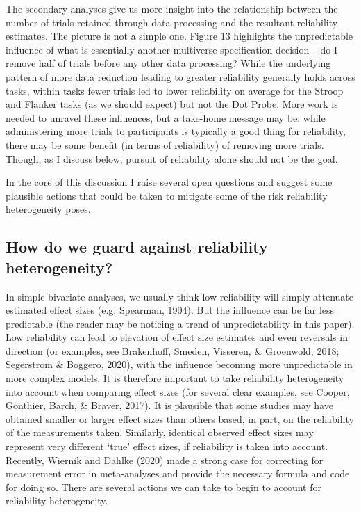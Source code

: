 \documentclass[
  english,
  man,floatsintext]{apa6}
\begin{document}
The secondary analyses give us more insight into the relationship between the number of trials retained through data processing and the resultant reliability estimates. The picture is not a simple one. Figure 13 highlights the unpredictable influence of what is essentially another multiverse specification decision -- do I remove half of trials before any other data processing? While the underlying pattern of more data reduction leading to greater reliability generally holds across tasks, within tasks fewer trials led to lower reliability on average for the Stroop and Flanker tasks (as we should expect) but not the Dot Probe. More work is needed to unravel these influences, but a take-home message may be: while administering more trials to participants is typically a good thing for reliability, there may be some benefit (in terms of reliability) of removing more trials. Though, as I discuss below, pursuit of reliability alone should not be the goal.

In the core of this discussion I raise several open questions and suggest some plausible actions that could be taken to mitigate some of the risk reliability heterogeneity poses.

\hypertarget{how-do-we-guard-against-reliability-heterogeneity}{%
\subsection{How do we guard against reliability heterogeneity?}\label{how-do-we-guard-against-reliability-heterogeneity}}

In simple bivariate analyses, we usually think low reliability will simply attenuate estimated effect sizes (e.g. Spearman, 1904). But the influence can be far less predictable (the reader may be noticing a trend of unpredictability in this paper). Low reliability can lead to elevation of effect size estimates and even reversals in direction (or examples, see Brakenhoff, Smeden, Visseren, \& Groenwold, 2018; Segerstrom \& Boggero, 2020), with the influence becoming more unpredictable in more complex models. It is therefore important to take reliability heterogeneity into account when comparing effect sizes (for several clear examples, see Cooper, Gonthier, Barch, \& Braver, 2017). It is plausible that some studies may have obtained smaller or larger effect sizes than others based, in part, on the reliability of the measurements taken. Similarly, identical observed effect sizes may represent very different `true' effect sizes, if reliability is taken into account. Recently, Wiernik and Dahlke (2020) made a strong case for correcting for measurement error in meta-analyses and provide the necessary formula and code for doing so. There are several actions we can take to begin to account for reliability heterogeneity.
\end{document}
